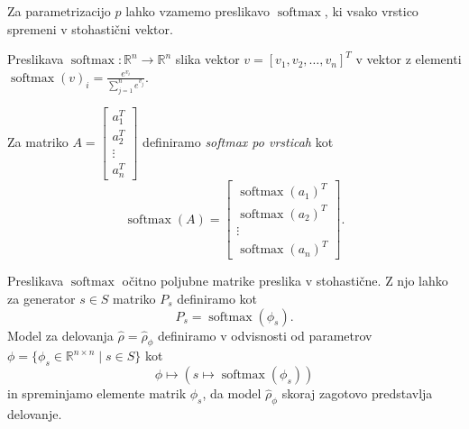 \documentclass[mat2, tisk]{fmfdelo}
\newcommand{\R}{\mathbb R}
\begin{document}
              Za parametrizacijo $p$ lahko vzamemo preslikavo
              $\operatorname{softmax}$, ki vsako vrstico spremeni v
              stohastični vektor.
              \begin{definicija}
                \label{def:softmax}
                Preslikava $\operatorname{softmax} \colon \R^n \to
                \R^n$ slika vektor $v = [v_1, v_2, \dotsc, v_n]^T$ v
                vektor z elementi $\operatorname{softmax}(v)_i =
                \frac{e^{v_i}}{\sum_{j = 1}^n e^{v_j}}$.

                Za matriko $A =
                \begin{bmatrix}
                  a_1^T \\
                  a_2^T \\
                  \vdots \\
                  a_n^T
                \end{bmatrix}$ definiramo \emph{softmax po vrsticah} kot
                $$\operatorname{softmax}(A) =
                \begin{bmatrix}
                  \operatorname{softmax}(a_1)^T \\
                  \operatorname{softmax}(a_2)^T \\
                  \vdots \\
                  \operatorname{softmax}(a_n)^T
                \end{bmatrix}.$$
              \end{definicija}
              Preslikava $\operatorname{softmax}$ očitno poljubne
              matrike preslika v stohastične. Z njo lahko za
              generator $s \in S$ matriko $P_s$ definiramo kot
              $$
              P_s = \operatorname{softmax}(\phi_s).
              $$
              Model za delovanja $\hat \rho = \hat \rho_\phi$
              definiramo v odvisnosti od parametrov $\phi = \{\phi_s
              \in \R^{n \times n } \mid s \in S\}$ kot
              $$
              \phi \mapsto ( s \mapsto \operatorname{softmax}(\phi_s))
              $$
              in spreminjamo elemente matrik $ \phi_s$, da model
              $\hat \rho_\phi$ skoraj zagotovo predstavlja delovanje.
\end{document}
